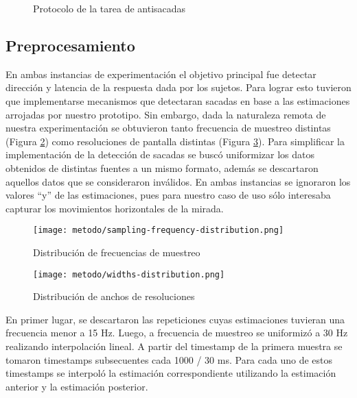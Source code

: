 \begin{figure}
    \centering
    \caption{Protocolo de la tarea de antisacadas}
    \label{fig:antisaccades-protocol}
\end{figure}

\subsection{Preprocesamiento} \label{section:preprocessing}

En ambas instancias de experimentación el objetivo principal fue detectar
dirección y latencia de la respuesta dada por los sujetos.
Para lograr esto tuvieron que implementarse mecanismos que detectaran sacadas
en base a las estimaciones arrojadas por nuestro prototipo.
Sin embargo, dada la naturaleza remota de nuestra experimentación se obtuvieron
tanto frecuencia de muestreo distintas (Figura
\ref{fig:sampling-frequency-distribution}) como resoluciones de pantalla
distintas (Figura \ref{fig:widths-distribution}).
Para simplificar la implementación de la detección de sacadas se buscó
uniformizar los datos obtenidos de distintas fuentes a un mismo formato, además
se descartaron aquellos datos que se consideraron inválidos.
En ambas instancias se ignoraron los valores “y” de las estimaciones, pues para
nuestro caso de uso sólo interesaba capturar los movimientos horizontales de la
mirada.

\begin{figure}
  \centering
  \texttt{[image: metodo/sampling-frequency-distribution.png]}
  \caption{Distribución de frecuencias de muestreo}
  \label{fig:sampling-frequency-distribution}
\end{figure}

\begin{figure}
  \centering
  \texttt{[image: metodo/widths-distribution.png]}
  \caption{Distribución de anchos de resoluciones}
  \label{fig:widths-distribution}
\end{figure}

En primer lugar, se descartaron las repeticiones cuyas estimaciones tuvieran
una frecuencia menor a 15 Hz.
Luego, a frecuencia de muestreo se uniformizó a 30 Hz realizando interpolación
lineal.
A partir del timestamp de la primera muestra se tomaron timestamps subsecuentes
cada 1000 / 30 ms.
Para cada uno de estos timestamps se interpoló la estimación correspondiente
utilizando la estimación anterior y la estimación posterior. 

